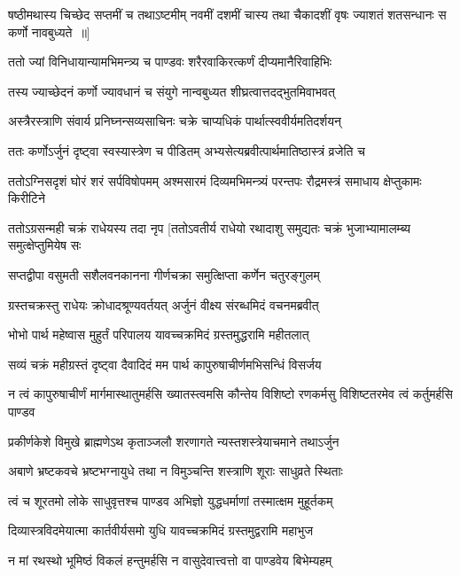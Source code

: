 \threelineshloka
{षष्ठीमथास्य चिच्छेद सप्तमीं च तथाऽष्टमीम्}
{नवमीं दशमीं चास्य तथा चैकादशीं वृषः}
{ज्याशतं शतसन्धानः स कर्णो नावबुध्यते ॥]}


\twolineshloka
{ततो ज्यां विनिधायान्यामभिमन्त्र्य च पाण्डवः}
{शरैरवाकिरत्कर्णं दीप्यमानैरिवाहिभिः}


\twolineshloka
{तस्य ज्याच्छेदनं कर्णो ज्यावधानं च संयुगे}
{नान्वबुध्यत शीघ्रत्वात्तदद्भुतमिवाभवत्}


\twolineshloka
{अस्त्रैरस्त्राणि संवार्य प्रनिघ्नन्सव्यसाचिनः}
{चक्रे चाप्यधिकं पार्थात्स्ववीर्यमतिदर्शयन्}


\twolineshloka
{ततः कर्णोऽर्जुनं दृष्ट्वा स्वस्यास्त्रेण च पीडितम्}
{अभ्यसेत्यब्रवीत्पार्थमातिष्ठास्त्रं व्रजेति च}


\threelineshloka
{ततोऽग्निसदृशं घोरं शरं सर्पविषोपमम्}
{अश्मसारमं दिव्यमभिमन्त्र्यं परन्तपः}
{रौद्रमस्त्रं समाधाय क्षेप्तुकामः किरीटिने}


ततोऽग्रसन्मही चक्रं राधेयस्य तदा नृप
\twolineshloka
{[ततोऽवतीर्य राधेयो रथादाशु समुद्यतः}
{चक्रं भुजाभ्यामालम्ब्य समुत्क्षेप्तुमियेष सः}


\twolineshloka
{सप्तद्वीपा वसुमती सशैलवनकानना}
{गीर्णचक्रा समुत्क्षिप्ता कर्णेन चतुरङ्गुलम्}


\twolineshloka
{ग्रस्तचक्रस्तु राधेयः क्रोधादश्रूण्यवर्तयत्}
{अर्जुनं वीक्ष्य संरब्धमिदं वचनमब्रवीत्}


\twolineshloka
{भोभो पार्थ महेष्वास मुहुर्तं परिपालय}
{यावच्चक्रमिदं ग्रस्तमुद्धरामि महीतलात्}


\twolineshloka
{सव्यं चक्रं महीग्रस्तं दृष्ट्वा दैवादिदं मम}
{पार्थ कापुरुषाचीर्णमभिसन्धिं विसर्जय}


\threelineshloka
{न त्वं कापुरुषाचीर्णं मार्गमास्थातुमर्हसि}
{ख्यातस्त्वमसि कौन्तेय विशिष्टो रणकर्मसु}
{विशिष्टतरमेव त्वं कर्तुमर्हसि पाण्डव}


\twolineshloka
{प्रकीर्णकेशे विमुखे ब्राह्मणेऽथ कृताञ्जलौ}
{शरणागते न्यस्तशस्त्रेयाचमाने तथाऽर्जुन}


\twolineshloka
{अबाणे भ्रष्टकवचे भ्रष्टभग्नायुधे तथा}
{न विमुञ्चन्ति शस्त्राणि शूराः साधुव्रते स्थिताः}


\twolineshloka
{त्वं च शूरतमो लोके साधुवृत्तश्च पाण्डव}
{अभिज्ञो युद्धधर्माणां तस्मात्क्षम मुहूर्तकम्}


\twolineshloka
{दिव्यास्त्रविदमेयात्मा कार्तवीर्यसमो युधि}
{यावच्चक्रमिदं ग्रस्तमुद्वरामि महाभुज}


\twolineshloka
{न मां रथस्थो भूमिष्ठं विकलं हन्तुमर्हसि}
{न वासुदेवात्त्वत्तो वा पाण्डवेय बिभेम्यहम्}



